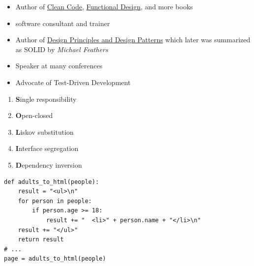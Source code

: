 \documentclass[calcdimensions,landscape,letterpaper]{powersem}
\newcommand{\thecurrentheading}{}
\newcommand{\heading}[1]{\renewcommand{\thecurrentheading}{#1}}
\begin{document}
\begin{slide}
\begin{center}
\begin{minipage}[c]{.65\textwidth}
\begin{itemize}
        \item Author of \href{https://www.informit.com/store/clean-code-a-handbook-of-agile-software-craftsmanship-9780132350884}{Clean Code}, \href{https://www.informit.com/store/functional-design-principles-patterns-and-practices-9780138176396}{Functional Design}, and more books
        \item software consultant and trainer
        \item Author of \href{https://web.archive.org/web/20150906155800/http://www.objectmentor.com/resources/articles/Principles_and_Patterns.pdf}{Design Principles and Design Patterns} which later was summarized as SOLID by \emph{Michael Feathers}
        \item Speaker at many conferences
        \item Advocate of Test-Driven Development
      \end{itemize}
    \end{minipage}
  \end{center}
\end{slide}

\begin{slide}
  \heading{The SOLID Principles}
  \begin{center}
    \begin{Large}
      \begin{minipage}[c]{.6\textwidth}
        \begin{enumerate}
          \item \textbf{S}ingle responsibility
          \item \textbf{O}pen-closed
          \item \textbf{L}iskov substitution
          \item \textbf{I}nterface segregation
          \item \textbf{D}ependency inversion
        \end{enumerate}
      \end{minipage}
    \end{Large}
  \end{center}
\end{slide}

\begin{slide}
  \heading{Single Responsibility - Before}
  \begin{center}
    \begin{verbatim}
def adults_to_html(people):
    result = "<ul>\n"
    for person in people:
        if person.age >= 18:
            result += "  <li>" + person.name + "</li>\n"
    result += "</ul>"
    return result
# ...
page = adults_to_html(people)
    \end{verbatim}
  \end{center}
\end{slide}
\end{document}
